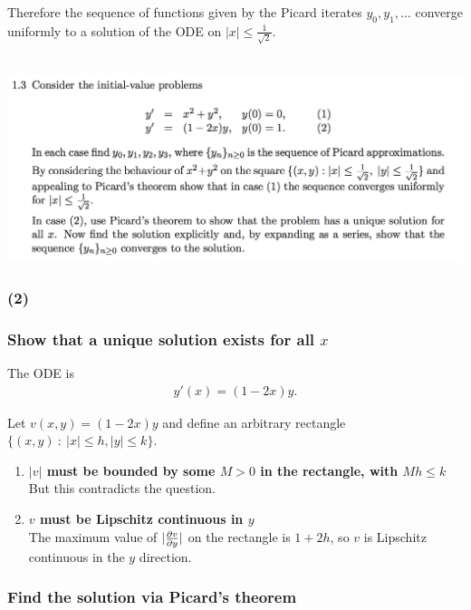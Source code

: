 \documentclass[12pt]{article}
\begin{document}
Therefore the sequence of functions given by the Picard iterates
$y_0, y_1, \ldots$ converge uniformly to a solution of the ODE on
$|x| \leq \frac{1}{\sqrt{2}}$.\\\\

\newpage
\begin{mdframed}
\includegraphics[width=400pt]{img/differential-equations-a1-1-3.png}\\
\end{mdframed}
\subsubsection*{(2)}
\subsubsection*{Show that a unique solution exists for all $x$}
The ODE is
\begin{align*}
  y'(x) = (1 - 2x)y.
\end{align*}

Let $v(x, y) = (1 - 2x)y$ and define an arbitrary rectangle
$\{(x, y) ~:~ |x| \leq h, |y| \leq k\}$.

\begin{enumerate}
\item \textbf{$|v|$ must be bounded by some $M>0$ in the rectangle, with $Mh \leq k$}\\
   But this contradicts the
  question.

\item \textbf{$v$ must be Lipschitz continuous in $y$}\\
  The maximum value of $|\frac{\partial v}{\partial y}|$ on the rectangle is $1 + 2h$, so $v$
  is Lipschitz continuous in the $y$ direction.
\end{enumerate}


\subsubsection*{Find the solution via Picard's theorem}
\end{document}
